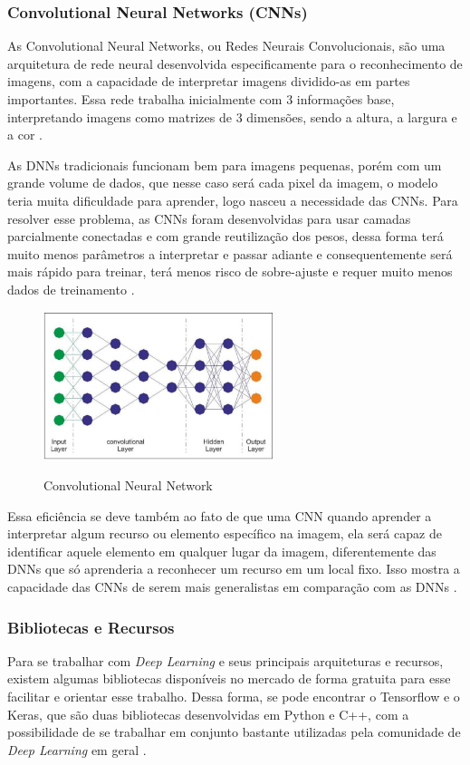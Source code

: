 \subsubsection{Convolutional Neural Networks (CNNs)}
As Convolutional Neural Networks, ou Redes Neurais Convolucionais, são uma arquitetura de rede neural desenvolvida especificamente para o reconhecimento de imagens, com a capacidade de interpretar imagens dividido-as em partes importantes. Essa rede trabalha inicialmente com 3 informações base, interpretando imagens como matrizes de 3 dimensões, sendo a altura, a largura e a cor \cite{deepLearningTensorFlow}.

As DNNs tradicionais funcionam bem para imagens pequenas, porém com um grande volume de dados, que nesse caso será cada pixel da imagem, o modelo teria muita dificuldade para aprender, logo nasceu a necessidade das CNNs. Para resolver esse problema, as CNNs foram desenvolvidas para usar camadas parcialmente conectadas e com grande reutilização dos pesos, dessa forma terá muito menos parâmetros a interpretar e passar adiante e consequentemente será mais rápido para treinar, terá menos risco de sobre-ajuste e requer muito menos dados de treinamento \cite{deepLearningTensorFlow}.

\begin{figure}[!htb]
	\centering
	\caption{Convolutional Neural Network}
	\includegraphics[width=0.60\textwidth]{img/cnn.jpg}
	\label{fig:cnn}
\end{figure}

Essa eficiência se deve também ao fato de que uma CNN quando aprender a interpretar algum recurso ou elemento específico na imagem, ela será capaz de identificar aquele elemento em qualquer lugar da imagem, diferentemente das DNNs que só aprenderia a reconhecer um recurso em um local fixo. Isso mostra a capacidade das CNNs de serem mais generalistas em comparação com as DNNs \cite{deepLearningTensorFlow}.

\subsubsection{Bibliotecas e Recursos}
Para se trabalhar com \emph{Deep Learning} e seus principais arquiteturas e recursos, existem algumas bibliotecas disponíveis no mercado de forma gratuita para esse facilitar e orientar esse trabalho. Dessa forma, se pode encontrar o Tensorflow e o Keras, que são duas bibliotecas desenvolvidas em Python e C++, com a possibilidade de se trabalhar em conjunto bastante utilizadas pela comunidade de \emph{Deep Learning} em geral \cite{deepLearningTensorFlow}.

